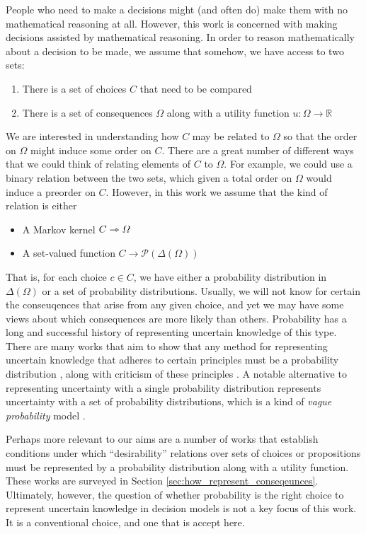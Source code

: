 People who need to make a decisions might (and often do) make them with no mathematical reasoning at all. However, this work is concerned with making decisions assisted by mathematical reasoning. In order to reason mathematically about a decision to be made, we assume that somehow, we have access to two sets:
\begin{enumerate}
    \item There is a set of choices $C$ that need to be compared
    \item There is a set of consequences $\Omega$ along with a utility function $u:\Omega\to \mathbb{R}$
\end{enumerate}

We are interested in understanding how $C$ may be related to $\Omega$ so that the order on $\Omega$ might induce some order on $C$. There are a great number of different ways that we could think of relating elements of $C$ to $\Omega$. For example, we could use a binary relation between the two sets, which given a total order on $\Omega$ would induce a preorder on $C$. However, in this work we assume that the kind of relation is either
\begin{itemize}
    \item A Markov kernel $C\rightarrowtriangle \Omega$
    \item A set-valued function $C\to \mathscr{P}(\Delta(\Omega))$
\end{itemize}

That is, for each choice $c\in C$, we have either a probability distribution in $\Delta(\Omega)$ or a set of probability distributions. Usually, we will not know for certain the conseuqences that arise from any given choice, and yet we may have some views about which consequences are more likely than others. Probability has a long and successful history of representing uncertain knowledge of this type. There are many works that aim to show that any method for representing uncertain knowledge that adheres to certain principles must be a probability distribution \citet{de_finetti_foresight_1992,horvitz_framework_1986}, along with criticism of these principles \citet{halpern_counter_1999}. A notable alternative to representing uncertainty with a single probability distribution represents uncertainty with a set of probability distributions, which is a kind of \emph{vague probability} model \citep{walley_statistical_1991}. 

Perhaps more relevant to our aims are a number of works that establish conditions under which ``desirability'' relations over sets of choices or propositions must be represented by a probability distribution along with a utility function. These works are surveyed in Section \ref{sec:how_represent_conseqeunces}. Ultimately, however, the question of whether probability is the right choice to represent uncertain knowledge in decision models is not a key focus of this work. It is a conventional choice, and one that is accept here.

